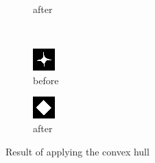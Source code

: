 \documentclass[12pt]{article}
\begin{document}
\begin{figure}[H]
\begin{subfigure}[t]{\subfiguresize}
        \caption{after}
    \end{subfigure}\\[2em]

    \begin{subfigure}[t]{\subfiguresize}
        \includegraphics[width=\textwidth]{img/image2.png}
        \caption{before}
    \end{subfigure}
    \hspace{2em}
    \begin{subfigure}[t]{\subfiguresize}
        \includegraphics[width=\textwidth]{img/image2-convexhull.png}
        \caption{after}
    \end{subfigure}
    \caption{Result of applying the convex hull}
\end{figure}
\end{document}
